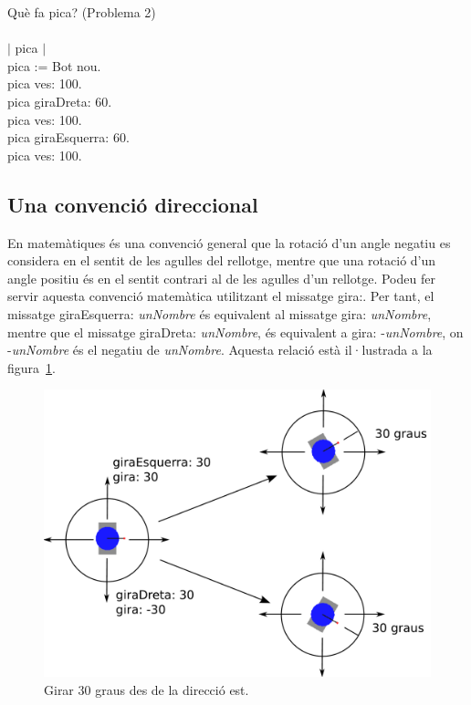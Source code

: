 \begin{script}  Què fa pica? (Problema 2)
\noindent
\textsf{\upshape
\\
\\$|$ pica $|$\\
pica := Bot nou.\\
pica ves: 100.\\
pica giraDreta: 60.\\
pica ves: 100.\\
pica giraEsquerra: 60.\\
pica ves: 100.\\
}
\label{scr4-2}
\end{script}

\subsection{Una convenció direccional}
En matemàtiques és una convenció general que la rotació d'un angle negatiu es considera en el sentit de les agulles del rellotge, mentre que una rotació d'un angle positiu és en el sentit contrari al de les agulles d'un rellotge. Podeu fer servir aquesta convenció matemàtica utilitzant el missatge \textsf{gira:}. Per tant, el missatge \textsf{giraEsquerra: {\itshape unNombre}} és equivalent al missatge  \textsf{gira: {\itshape unNombre}}, mentre que el missatge  \textsf{giraDreta: {\itshape unNombre}}, és equivalent a  \textsf{gira: -{\itshape unNombre}}, on  \mbox{\textsf{-{\itshape unNombre}}} és el negatiu de  \textsf{{\itshape unNombre}}. Aquesta relació està il·lustrada a la figura~\ref{fig0402}.  

\begin{figure}[h!]
\begin{center}
\includegraphics[scale=0.21]{Imatges/figura4-2}
\end{center}
\caption{Girar 30 graus des de la direcció est.}
\label{fig0402}
\end{figure}

